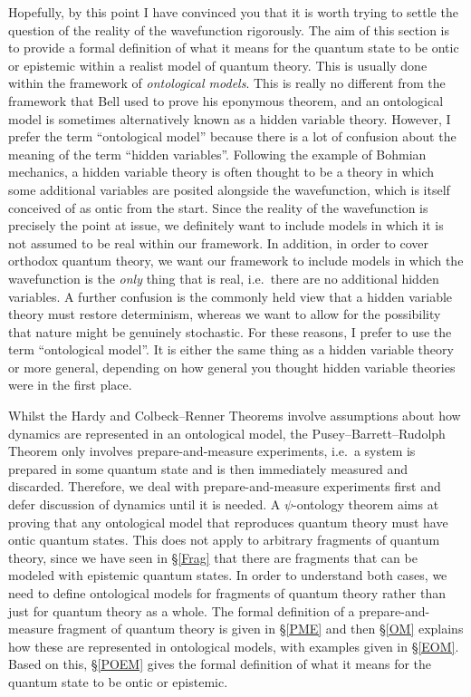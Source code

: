 \documentclass[DIV=calc,paper=a4,fontsize=11pt,twocolumn]{scrartcl} %
\theoremstyle{definition}
\theoremstyle{plain}
\begin{document}
Hopefully, by this point I have convinced you that it is worth trying
to settle the question of the reality of the wavefunction rigorously.
The aim of this section is to provide a formal definition of what it
means for the quantum state to be ontic or epistemic within a realist
model of quantum theory.  This is usually done within the framework of
\emph{ontological models}.  This is really no different from the
framework that Bell used to prove his eponymous theorem, and an
ontological model is sometimes alternatively known as a hidden
variable theory.  However, I prefer the term ``ontological model''
because there is a lot of confusion about the meaning of the term
``hidden variables''.  Following the example of Bohmian mechanics, a
hidden variable theory is often thought to be a theory in which some
additional variables are posited alongside the wavefunction, which is
itself conceived of as ontic from the start.  Since the reality of the
wavefunction is precisely the point at issue, we definitely want to
include models in which it is not assumed to be real within our
framework.  In addition, in order to cover orthodox quantum theory, we
want our framework to include models in which the wavefunction is the
\emph{only} thing that is real, i.e.\ there are no additional hidden
variables.  A further confusion is the commonly held view that a
hidden variable theory must restore determinism, whereas we want to
allow for the possibility that nature might be genuinely stochastic.
For these reasons, I prefer to use the term ``ontological model''.  It
is either the same thing as a hidden variable theory or more general,
depending on how general you thought hidden variable theories were in
the first place.

Whilst the Hardy and Colbeck--Renner Theorems involve assumptions about
how dynamics are represented in an ontological model, the Pusey--Barrett--Rudolph Theorem
only involves prepare-and-measure experiments, i.e.\ a system is
prepared in some quantum state and is then immediately measured and
discarded.  Therefore, we deal with prepare-and-measure experiments
first and defer discussion of dynamics until it is needed.  A
$\psi$-ontology theorem aims at proving that any ontological model
that reproduces quantum theory must have ontic quantum states.  This
does not apply to arbitrary fragments of quantum theory, since we have
seen in \S\ref{Frag} that there are fragments that can be modeled
with epistemic quantum states.  In order to understand both cases, we
need to define ontological models for fragments of quantum theory
rather than just for quantum theory as a whole.  The formal definition
of a prepare-and-measure fragment of quantum theory is given in
\S\ref{PME} and then \S\ref{OM} explains how these are represented in
ontological models, with examples given in \S\ref{EOM}.  Based on
this, \S\ref{POEM} gives the formal definition of what it means for
the quantum state to be ontic or epistemic.
\end{document}
